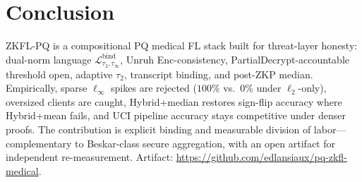 \documentclass[conference]{IEEEtran}
\begin{document}
\section{Conclusion}
ZKFL-PQ is a compositional PQ medical FL stack built for threat-layer honesty: dual-norm language $\mathcal{L}_{\tau_2,\tau_\infty}^{\mathrm{bind}}$, Unruh Enc-consistency, PartialDecrypt-accountable threshold open, adaptive $\tau_2$, transcript binding, and post-ZKP median. Empirically, sparse $\ell_\infty$ spikes are rejected ($100\%$ vs.\ $0\%$ under $\ell_2$-only), oversized clients are caught, Hybrid+median restores sign-flip accuracy where Hybrid+mean fails, and UCI pipeline accuracy stays competitive under denser proofs. The contribution is explicit binding and measurable division of labor---complementary to Beskar-class secure aggregation, with an open artifact for independent re-measurement. Artifact: \url{https://github.com/edlansiaux/pq-zkfl-medical}.
\end{document}
